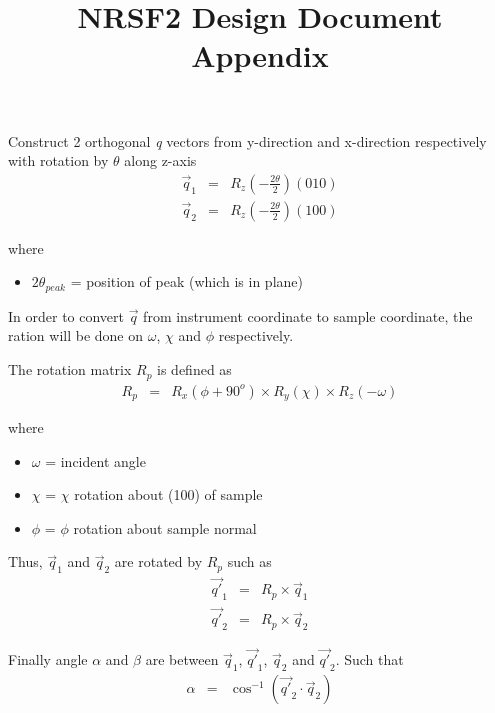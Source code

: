 \documentclass[12pt,bezier,amstex]{report}  %
\title{NRSF2 Design Document Appendix}
\begin{document}
\maketitle

Construct 2 orthogonal {\it q} vectors from y-direction and x-direction respectively with rotation by $\theta$ along z-axis
\begin{eqnarray*}
\vec{q}_1 &=&
	R_z (- \frac{2\theta}{2}) (010)  \\
\vec{q}_2 &=&
	R_z(-\frac{2\theta}{2}) (100)
\end{eqnarray*}

where
\begin{itemize}
\item	$2\theta_{peak}$ = position of peak (which is in plane)
\end{itemize}

In order to convert $\vec{q}$ from instrument coordinate to sample coordinate, the ration will be done on
$\omega$, $\chi$ and $\phi$ respectively.

The rotation matrix $R_p$ is defined as
\begin{eqnarray*}
R_p &=& R_x(\phi + 90^o) \times R_y(\chi) \times R_z(-\omega)
\end{eqnarray*}

where
\begin{itemize}
\item	$\omega$ = incident angle
\item	$\chi$ = $\chi$ rotation about (100) of sample
\item	$\phi$ =  $\phi$ rotation about sample normal
\end{itemize}

Thus, $\vec{q}_1$ and $\vec{q}_2$ are rotated by $R_p$ such as
\begin{eqnarray*}
\vec{q\prime}_1 &=& R_p\times \vec{q}_1	\\
\vec{q\prime}_2 &=& R_p\times \vec{q}_2
\end{eqnarray*}

Finally angle $\alpha$ and $\beta$ are between $\vec{q}_1$, $\vec{q\prime}_1$, $\vec{q}_2$ and $\vec{q\prime}_2$.
Such that
\begin{eqnarray*}
\alpha &=& \cos^{-1}(\vec{q\prime}_2\cdot\vec{q}_2)
\end{eqnarray*}
\end{document}
